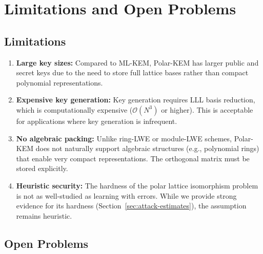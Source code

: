 \documentclass[11pt,a4paper]{article}
\newcommand{\polarKem}{\textsf{Polar-KEM}\xspace}
\newcommand{\MLKEM}{\textsf{ML-KEM}\xspace}
\begin{document}
\section{Limitations and Open Problems}\label{sec:limitations}

\subsection{Limitations}

\begin{enumerate}[leftmargin=2em]
\item \textbf{Large key sizes:} Compared to \MLKEM, \polarKem has larger public and secret keys due to the need to store full lattice bases rather than compact polynomial representations.

\item \textbf{Expensive key generation:} Key generation requires LLL basis reduction, which is computationally expensive ($\mathcal{O}(N^3)$ or higher). This is acceptable for applications where key generation is infrequent.

\item \textbf{No algebraic packing:} Unlike ring-LWE or module-LWE schemes, \polarKem does not naturally support algebraic structures (e.g., polynomial rings) that enable very compact representations. The orthogonal matrix must be stored explicitly.

\item \textbf{Heuristic security:} The hardness of the polar lattice isomorphism problem is not as well-studied as learning with errors. While we provide strong evidence for its hardness (Section~\ref{sec:attack-estimates}), the assumption remains heuristic.
\end{enumerate}

\subsection{Open Problems}
\end{document}
